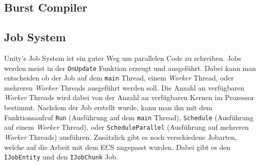 \documentclass[12pt, titlepage]{article}
\DeclareRobustCommand{\#}{\adjustbox{valign=B,totalheight=.57\baselineskip}{\oldhash}}%
\begin{document}
\subsection{Burst Compiler} \label{burst}
\subsection{Job System} \label{jobs}
Unity's Job System ist ein guter Weg um parallelen Code zu schreiben. Jobs werden meist in der \texttt{OnUpdate} Funktion erzeugt und ausgeführt. Dabei kann man entscheiden ob der Job auf dem \texttt{main} Thread, einem \textit{Worker} Thread, oder mehreren \textit{Worker} Threads ausgeführt werden soll. Die Anzahl an verfügbaren \textit{Worker} Threads wird dabei von der Anzahl an verfügbaren Kernen im Prozessor bestimmt. Nachdem der Job erstellt wurde, kann man ihn mit dem Funktionsaufruf \texttt{Run} (Ausführung auf dem \texttt{main} Thread), \texttt{Schedule} (Ausführung auf einem \textit{Worker} Thread), oder \texttt{ScheduleParallel} (Ausführung auf mehreren \textit{Worker} Threads) ausführen. Zusätzlich gibt es noch verschiedene Jobarten, welche auf die Arbeit mit dem ECS angepasst wurden. Dabei gibt es den \texttt{IJobEntity} und den \texttt{IJobChunk} Job.
\end{document}
